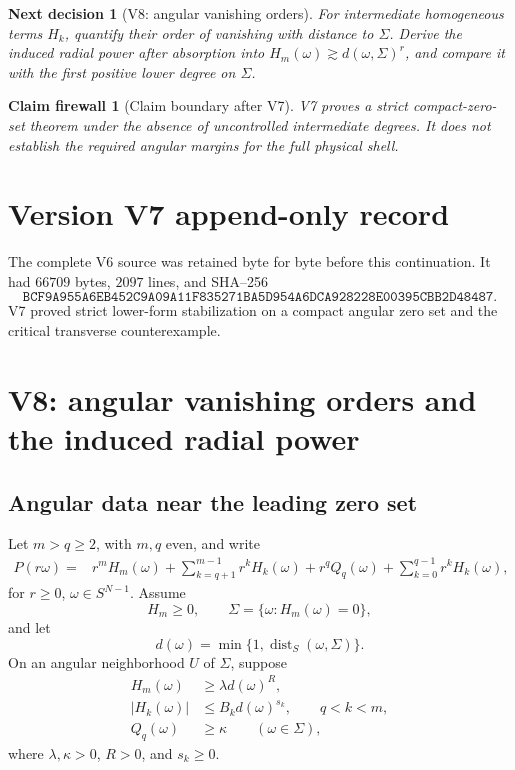 \documentclass[11pt]{article}
\newtheorem{firewall}[theorem]{Claim firewall}
\newtheorem{decision}[theorem]{Next decision}
\theoremstyle{remark}
\begin{document}
\begin{decision}[V8: angular vanishing orders]
\label{dec:v17v7-next}
For intermediate homogeneous terms \(H_k\), quantify their order of
vanishing with distance to \(\Sigma\).  Derive the induced radial
power after absorption into
\(H_m(\omega)\gtrsim d(\omega,\Sigma)^r\), and compare it with the
first positive lower degree on \(\Sigma\).
\end{decision}

\begin{firewall}[Claim boundary after V7]
\label{fire:v17v7}
V7 proves a strict compact-zero-set theorem under the absence of
uncontrolled intermediate degrees.  It does not establish the
required angular margins for the full physical shell.
\end{firewall}

\section*{Version V7 append-only record}
The complete V6 source was retained byte for byte before this
continuation.  It had \(66709\) bytes, \(2097\) lines, and SHA--256
\[
 \texttt{BCF9A955A6EB452C9A09A11F835271BA5D954A6DCA928228E00395CBB2D48487}.
\]
V7 proved strict lower-form stabilization on a compact angular zero
set and the critical transverse counterexample.


\section{V8: angular vanishing orders and the induced radial power}
\label{sec:v17v8}

\subsection{Angular data near the leading zero set}

Let \(m>q\geq2\), with \(m,q\) even, and write
\[
\begin{split}
 P(r\omega)
 ={}&
 r^mH_m(\omega)
 +\sum_{k=q+1}^{m-1}r^kH_k(\omega)
 +r^qQ_q(\omega)
 +\sum_{k=0}^{q-1}r^kH_k(\omega),                  \tag{8.1}
\end{split}
\]
for \(r\geq0\), \(\omega\in S^{N-1}\).  Assume
\[
 H_m\geq0,\qquad
 \Sigma=\{\omega:H_m(\omega)=0\},                  \tag{8.2}
\]
and let
\[
 d(\omega)=\min\{1,\operatorname{dist}_S(\omega,\Sigma)\}.
                                                               \tag{8.3}
\]
On an angular neighborhood \(U\) of \(\Sigma\), suppose
\[
\begin{split}
 H_m(\omega)&\geq\lambda d(\omega)^R,\\
 |H_k(\omega)|&\leq B_kd(\omega)^{s_k},
 \qquad q<k<m,                                     \tag{8.4}\\
 Q_q(\omega)&\geq\kappa
 \qquad(\omega\in\Sigma),
\end{split}
\]
where \(\lambda,\kappa>0\), \(R>0\), and \(s_k\geq0\).
\end{document}
